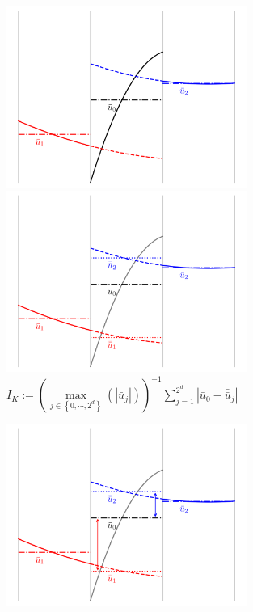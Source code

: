 \documentclass{beamer}
\begin{document}
\begin{frame}
\begin{figure}
\begin{overprint}
        \centering\includegraphics[width=0.7\textwidth]{./fig.tci_03.png}
        \centering\includegraphics[width=0.7\textwidth]{./fig.tci_04.png}
        $I_{K} :=
        \left(\max\limits_{j\in\left\{0,\cdots,2^{d}\right\}}
        \left(\left|\bar{u}_{j}\right|\right)\right)^{-1}
        \sum\limits_{j=1}^{2^{d}}
        \left|\bar{u}_{0}-\bar{\bar{u}}_{j}\right|$

        \centering\includegraphics[width=0.7\textwidth]{./fig.tci_05.png}
    \end{overprint}
  \end{figure}

\end{frame}
\end{document}

